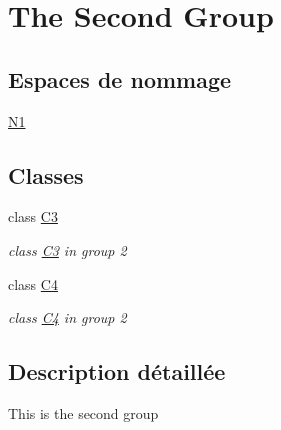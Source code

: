 \hypertarget{group__group2}{}\section{The Second Group}
\label{group__group2}
\subsection*{Espaces de nommage}
\begin{DoxyCompactItemize}
\item 
 \hyperlink{namespace_n1}{N1}
\end{DoxyCompactItemize}
\subsection*{Classes}
\begin{DoxyCompactItemize}
\item 
class \hyperlink{class_c3}{C3}
\begin{DoxyCompactList}\small\item\em class \hyperlink{class_c3}{C3} in group 2 \end{DoxyCompactList}\item 
class \hyperlink{class_c4}{C4}
\begin{DoxyCompactList}\small\item\em class \hyperlink{class_c4}{C4} in group 2 \end{DoxyCompactList}\end{DoxyCompactItemize}


\subsection{Description détaillée}
This is the second group 